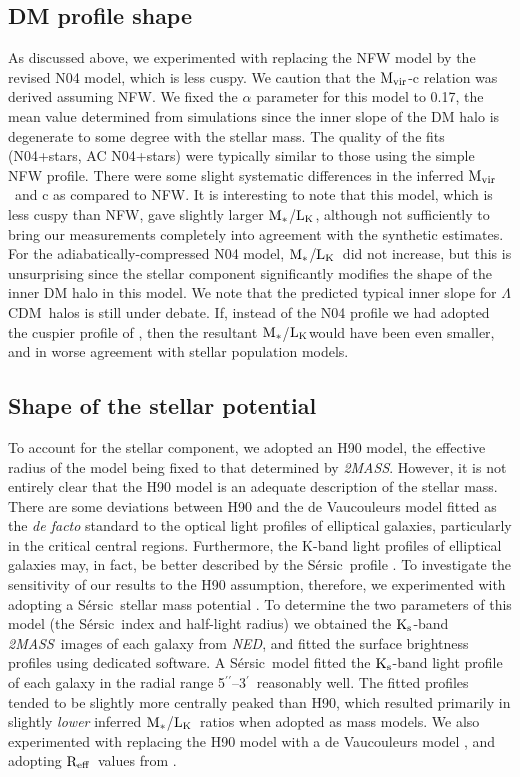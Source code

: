 \documentclass{emulateapj}
\def \arcmin {\hbox{$^\prime$}}
\def \arcsec {\hbox{$^{\prime\prime}$}}
\def \eg {e.g.}
\newcommand{\mvir}{${\rm M_{vir}}$}
\newcommand{\reff}{${\rm R_{eff}}$}
\newcommand{\mstars}{${\rm M_{*}}$}
\newcommand{\sersic}{S\'{e}rsic}
\newcommand{\lcdm}{$\Lambda$CDM}
\newcommand{\lk }{${\rm L_K}$}
\newcommand{\ks }{${\rm K_s}$}
\newcommand{\twomass}{{\em 2MASS}}
\newcommand{\ned}{{\em{NED}}}
\begin{document}
\subsection{DM profile shape} \label{sect_n04}
As discussed above, we experimented with replacing the NFW model by
the revised N04 model, which is less cuspy. 
We caution that the \mvir-c relation was 
derived assuming NFW.
We fixed the $\alpha$ parameter for this model to 0.17, the 
mean value determined from simulations since the inner slope 
of the DM halo is degenerate to some degree with the stellar mass. 
The quality of the fits (N04+stars, AC N04+stars) were typically similar to 
those using the simple NFW profile. There were some slight systematic 
differences
in the inferred \mvir\ and c as compared to NFW. It is interesting
to note that this model, which is less cuspy than NFW, gave
slightly larger \mstars/\lk, although not sufficiently to bring our
measurements completely into agreement with the synthetic estimates.
For the adiabatically-compressed N04 model, \mstars/\lk\ did not
increase, but this is unsurprising since the stellar component
significantly modifies the shape of the inner DM halo in this 
model.  We note that the predicted typical inner slope for
\lcdm\ halos is still under debate.  If, instead of the N04 profile
we had adopted the cuspier profile of  \citet{diemand05a}, 
then the resultant \mstars/\lk would have been even smaller, and in 
worse agreement with stellar population models.


\subsection{Shape of the stellar potential} \label{sect_syserr_potential}
To account for the stellar component, we adopted an H90 model,
the effective radius of the model being fixed to that 
determined by \twomass. However, it is not entirely clear
that the H90 model is an adequate description of the stellar
mass. There are some deviations between H90 and the 
de Vaucouleurs model fitted as the {\em de facto} standard
to the optical light profiles of elliptical galaxies,
particularly in the critical central regions. 
Furthermore, the K-band light profiles of elliptical galaxies may, 
in fact, be better described by the \sersic\ profile
\citep[\eg][]{brown03a}.
To investigate the sensitivity of our results to the H90 assumption,
therefore, we experimented with adopting a \sersic\ stellar mass
potential \citep[\eg][]{prugniel97a}. 
To determine the two parameters of this model 
(the \sersic\ index and half-light
radius) we obtained the \ks-band \twomass\ images of each galaxy
from \ned, and fitted the surface brightness profiles
using dedicated software. A \sersic\ model fitted the 
\ks-band light profile of each galaxy
in the radial range  5\arcsec--3\arcmin\ reasonably well.
The fitted profiles tended to be slightly more centrally peaked than 
H90, which resulted primarily in
slightly {\em lower} inferred \mstars/\lk\ ratios when adopted
as mass models. We also experimented with replacing the H90 model
with a de Vaucouleurs model \citep{mellier87a}, 
and adopting \reff\ values from \citet{pahre99a}.
\end{document}
